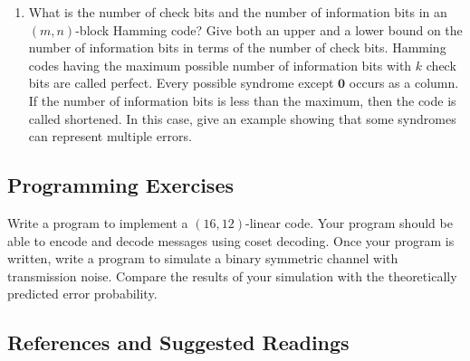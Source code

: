 {\begin{enumerate}
\begin{enumerate}
 \item
What is the number of check bits and the number of information bits in an
$(m,n)$-block Hamming code? Give both an upper and a lower bound on the
number of information bits in terms of the number of check bits.
Hamming codes having the maximum possible number of information bits
with $k$ check bits are called {\bfi
perfect}. Every possible syndrome except
${\mathbf 0}$ occurs as a column. If the number of information bits is
less than the maximum, then the code is called {\bfi
shortened}. In this case, give an example
showing that some syndromes can represent multiple errors.  
 
\end{enumerate}
 
 
\end{enumerate}
}
 
 
\subsection*{Programming Exercises}
 
 
{\small
Write a program to implement a $(16, 12)$-linear code.  Your program
should be able to encode and decode messages using coset decoding.
Once your program is written, write a program to simulate a binary
symmetric channel with transmission noise.  Compare the results of
your simulation with the theoretically predicted error probability. 
}
 
 
\subsection*{References and Suggested Readings}
 
